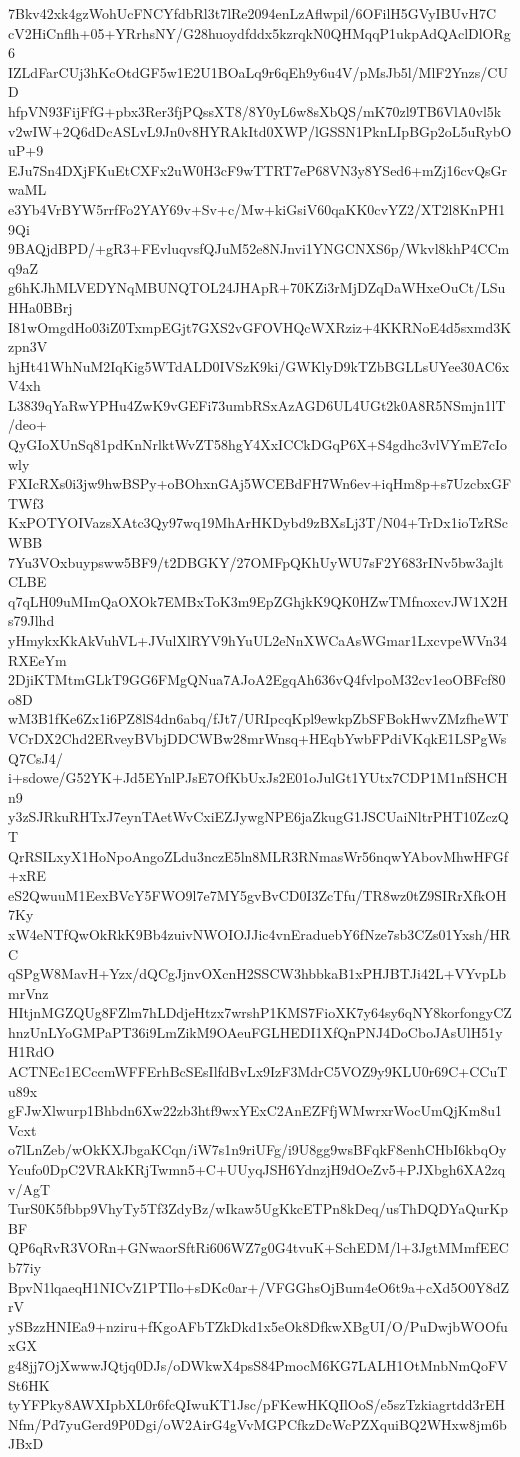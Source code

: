 7Bkv42xk4gzWohUcFNCYfdbRl3t7lRe2094enLzAflwpil/6OFilH5GVyIBUvH7C
cV2HiCnflh+05+YRrhsNY/G28huoydfddx5kzrqkN0QHMqqP1ukpAdQAclDlORg6
IZLdFarCUj3hKcOtdGF5w1E2U1BOaLq9r6qEh9y6u4V/pMsJb5l/MlF2Ynzs/CUD
hfpVN93FijFfG+pbx3Rer3fjPQssXT8/8Y0yL6w8sXbQS/mK70zl9TB6VlA0vl5k
v2wIW+2Q6dDcASLvL9Jn0v8HYRAkItd0XWP/lGSSN1PknLIpBGp2oL5uRybOuP+9
EJu7Sn4DXjFKuEtCXFx2uW0H3cF9wTTRT7eP68VN3y8YSed6+mZj16cvQsGrwaML
e3Yb4VrBYW5rrfFo2YAY69v+Sv+c/Mw+kiGsiV60qaKK0cvYZ2/XT2l8KnPH19Qi
9BAQjdBPD/+gR3+FEvluqvsfQJuM52e8NJnvi1YNGCNXS6p/Wkvl8khP4CCmq9aZ
g6hKJhMLVEDYNqMBUNQTOL24JHApR+70KZi3rMjDZqDaWHxeOuCt/LSuHHa0BBrj
I81wOmgdHo03iZ0TxmpEGjt7GXS2vGFOVHQcWXRziz+4KKRNoE4d5sxmd3Kzpn3V
hjHt41WhNuM2IqKig5WTdALD0IVSzK9ki/GWKlyD9kTZbBGLLsUYee30AC6xV4xh
L3839qYaRwYPHu4ZwK9vGEFi73umbRSxAzAGD6UL4UGt2k0A8R5NSmjn1lT/deo+
QyGIoXUnSq81pdKnNrlktWvZT58hgY4XxICCkDGqP6X+S4gdhc3vlVYmE7cIowly
FXIcRXs0i3jw9hwBSPy+oBOhxnGAj5WCEBdFH7Wn6ev+iqHm8p+s7UzcbxGFTWf3
KxPOTYOIVazsXAtc3Qy97wq19MhArHKDybd9zBXsLj3T/N04+TrDx1ioTzRScWBB
7Yu3VOxbuypsww5BF9/t2DBGKY/27OMFpQKhUyWU7sF2Y683rINv5bw3ajltCLBE
q7qLH09uMImQaOXOk7EMBxToK3m9EpZGhjkK9QK0HZwTMfnoxcvJW1X2Hs79Jlhd
yHmykxKkAkVuhVL+JVulXlRYV9hYuUL2eNnXWCaAsWGmar1LxcvpeWVn34RXEeYm
2DjiKTMtmGLkT9GG6FMgQNua7AJoA2EgqAh636vQ4fvlpoM32cv1eoOBFcf80o8D
wM3B1fKe6Zx1i6PZ8lS4dn6abq/fJt7/URIpcqKpl9ewkpZbSFBokHwvZMzfheWT
VCrDX2Chd2ERveyBVbjDDCWBw28mrWnsq+HEqbYwbFPdiVKqkE1LSPgWsQ7CsJ4/
i+sdowe/G52YK+Jd5EYnlPJsE7OfKbUxJs2E01oJulGt1YUtx7CDP1M1nfSHCHn9
y3zSJRkuRHTxJ7eynTAetWvCxiEZJywgNPE6jaZkugG1JSCUaiNltrPHT10ZczQT
QrRSILxyX1HoNpoAngoZLdu3nczE5ln8MLR3RNmasWr56nqwYAbovMhwHFGf+xRE
eS2QwuuM1EexBVcY5FWO9l7e7MY5gvBvCD0I3ZcTfu/TR8wz0tZ9SIRrXfkOH7Ky
xW4eNTfQwOkRkK9Bb4zuivNWOIOJJic4vnEraduebY6fNze7sb3CZs01Yxsh/HRC
qSPgW8MavH+Yzx/dQCgJjnvOXcnH2SSCW3hbbkaB1xPHJBTJi42L+VYvpLbmrVnz
HItjnMGZQUg8FZlm7hLDdjeHtzx7wrshP1KMS7FioXK7y64sy6qNY8korfongyCZ
hnzUnLYoGMPaPT36i9LmZikM9OAeuFGLHEDI1XfQnPNJ4DoCboJAsUlH51yH1RdO
ACTNEc1ECccmWFFErhBcSEsIlfdBvLx9IzF3MdrC5VOZ9y9KLU0r69C+CCuTu89x
gFJwXlwurp1Bhbdn6Xw22zb3htf9wxYExC2AnEZFfjWMwrxrWocUmQjKm8u1Vcxt
o7lLnZeb/wOkKXJbgaKCqn/iW7s1n9riUFg/i9U8gg9wsBFqkF8enhCHbI6kbqOy
Ycufo0DpC2VRAkKRjTwmn5+C+UUyqJSH6YdnzjH9dOeZv5+PJXbgh6XA2zqv/AgT
TurS0K5fbbp9VhyTy5Tf3ZdyBz/wIkaw5UgKkcETPn8kDeq/usThDQDYaQurKpBF
QP6qRvR3VORn+GNwaorSftRi606WZ7g0G4tvuK+SchEDM/l+3JgtMMmfEECb77iy
BpvN1lqaeqH1NICvZ1PTIlo+sDKc0ar+/VFGGhsOjBum4eO6t9a+cXd5O0Y8dZrV
ySBzzHNIEa9+nziru+fKgoAFbTZkDkd1x5eOk8DfkwXBgUI/O/PuDwjbWOOfuxGX
g48jj7OjXwwwJQtjq0DJs/oDWkwX4psS84PmocM6KG7LALH1OtMnbNmQoFVSt6HK
tyYFPky8AWXIpbXL0r6fcQIwuKT1Jsc/pFKewHKQIlOoS/e5szTzkiagrtdd3rEH
Nfm/Pd7yuGerd9P0Dgi/oW2AirG4gVvMGPCfkzDcWcPZXquiBQ2WHxw8jm6bJBxD
